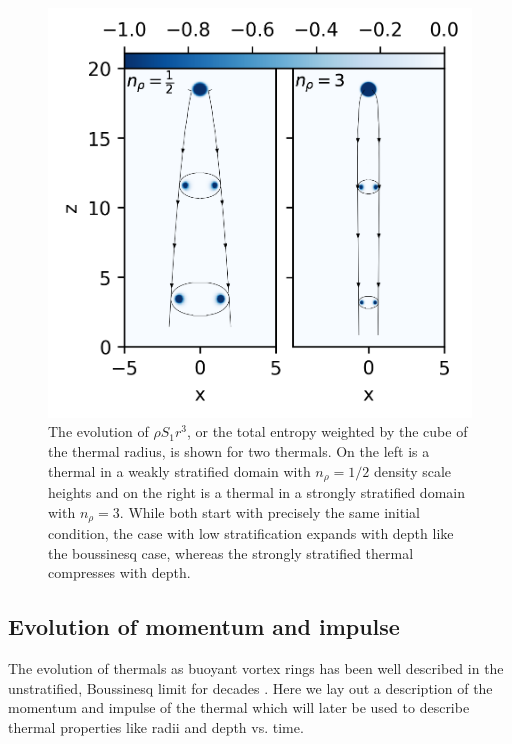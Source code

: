 \documentclass[twocolumn, amsmath, amsfonts, amssymb, trackchanges]{aastex62}
\begin{document}
\begin{figure}[t!]
    \includegraphics[width=\columnwidth]{evolution_colormeshes.png}
    \caption{
	The evolution of $\rho S_1 r^3$, or the total entropy weighted by the cube of the thermal radius, is shown for two thermals. 
	On the left is a thermal in a weakly stratified domain with $n_\rho = 1/2$ density scale heights and on the right is a thermal in a strongly stratified domain with $n_\rho = 3$.
	While both start with precisely the same initial condition, the case with low stratification expands with depth like the boussinesq case, whereas the strongly stratified thermal compresses with depth.
    \label{fig:evolution_colormeshes} }
\end{figure}


\subsection{Evolution of momentum and impulse}
The evolution of thermals as buoyant vortex rings has been well described in the unstratified, Boussinesq limit for decades \citep[see e.g.][for a description and sources]{lecoanet&jeevanjee2018}.
Here we lay out a description of the momentum and impulse of the thermal which will later be used to describe thermal properties like radii and depth vs. time.
\end{document}
